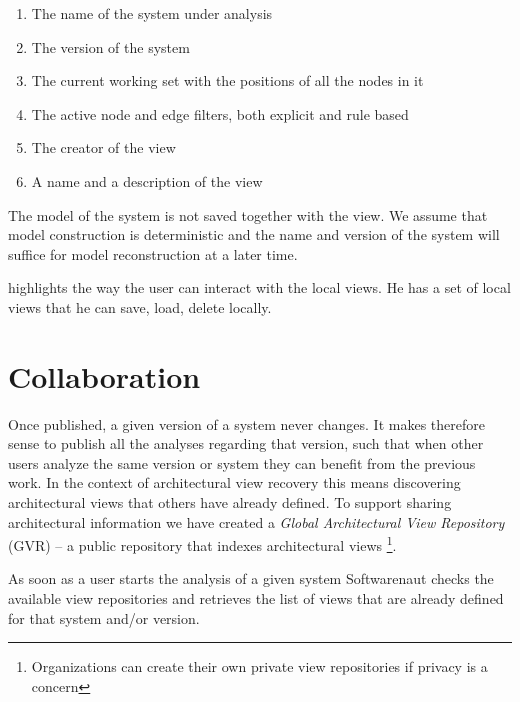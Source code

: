 \documentclass[preprint,12pt]{elsarticle}
\begin{document}
\begin{enumerate}
\item The name of the system under analysis
\item The version of the system 
\item The current working set with the positions of all the nodes in it
\item The active node and edge filters, both explicit and rule based
\item The creator of the view
\item A name and a description of the view
\end{enumerate}

The model of the system is not saved together with the view. We assume that model construction is deterministic and the name and version of the system will suffice for model reconstruction at a later time. %



 highlights the way the user can interact with the local views. He has a set of local views that he can save, load, delete locally. 


\newpage
\section {Collaboration}
\label {sec:collab}


Once published, a given version of a system never changes. It makes therefore sense to publish all the analyses regarding that version, such that when other users analyze the same version or system they can benefit from the previous work. In the context of architectural view recovery this means discovering architectural views that others have already defined. To support sharing architectural information we have created a {\em Global Architectural View Repository} (GVR) -- a public repository that indexes architectural views \footnote{
Organizations can create their own private view repositories if privacy is a concern}.


As soon as a user starts the analysis of a given system Softwarenaut checks the available view repositories and retrieves the list of views that are already defined for that system and/or version.
\end{document}
